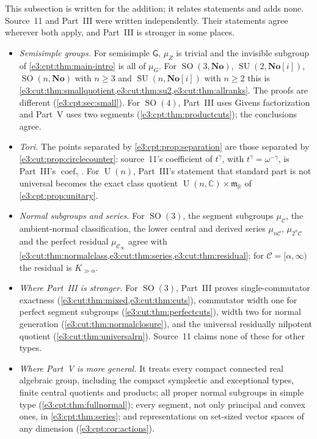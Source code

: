\documentclass[11pt,letterpaper]{article}
\numberwithin{equation}{section}
\theoremstyle{definition}
\theoremstyle{remark}
\newcommand{\No}{\mathbf{No}}
\newcommand{\R}{\mathbb R}
\newcommand{\C}{\mathbb C}
\newcommand{\mm}{\mathfrak m}
\newcommand{\SO}{\operatorname{SO}}
\newcommand{\SU}{\operatorname{SU}}
\newcommand{\Un}{\operatorname{U}}
\newcommand{\coef}{\operatorname{coef}}
\newcommand{\sG}{\mathsf G}
\begin{document}
This subsection is written for the addition; it relates statements and adds
none. Source~11 and Part~III were written independently. Their statements agree
wherever both apply, and Part~III is stronger in some places.
\begin{itemize}
\item \emph{Semisimple groups.} For semisimple $\sG$, $\mu_Z$ is trivial and the
invisible subgroup of \cref{e3:cpt:thm:main-intro} is all of $\mu_G$. For
$\SO(3,\No)$, $\SU(2,\No[i])$, $\SO(n,\No)$ with $n\ge3$ and $\SU(n,\No[i])$
with $n\ge2$ this is
\cref{e3:cut:thm:smallquotient,e3:cut:thm:su2,e3:cut:thm:allranks}. The proofs
are different (\cref{e3:cpt:sec:small}). For $\SO(4)$, Part~III uses Givens
factorization and Part~V uses two segments (\cref{e3:cpt:thm:productcuts}); the
conclusions agree.
\item \emph{Tori.} The points separated by \cref{e3:cpt:prop:separation} are
those separated by \cref{e3:cut:prop:circlecounter}: source~11's coefficient of
$t^\gamma$, with $t^\gamma=\omega^{-\gamma}$, is Part~III's $\coef_\gamma$. For
$\Un(n)$, Part~III's statement that standard part is not universal becomes the
exact class quotient $\Un(n,\C)\times\mm_{\R}$ of \cref{e3:cpt:prop:unitary}.
\item \emph{Normal subgroups and series.} For $\SO(3)$, the segment subgroups
$\mu_{\mathcal C}$, the ambient-normal classification, the lower central and
derived series $\mu_{n\mathcal C}$, $\mu_{2^n\mathcal C}$ and the perfect
residual $\mu_{\mathcal C_\infty}$ agree with
\cref{e3:cut:thm:normalclass,e3:cut:thm:series,e3:cut:thm:residual}; for
$\mathcal C=[\alpha,\infty)$ the residual is $K_{\gg\alpha}$.
\item \emph{Where Part~III is stronger.} For $\SO(3)$, Part~III proves
single-commutator exactness (\cref{e3:cut:thm:mixed,e3:cut:thm:cuts}),
commutator width one for perfect segment subgroups
(\cref{e3:cut:thm:perfectcuts}), width two for normal generation
(\cref{e3:cut:thm:normalclosure}), and the universal residually nilpotent
quotient (\cref{e3:cut:thm:universalrn}). Source~11 claims none of these for
other types.
\item \emph{Where Part~V is more general.} It treats every compact connected real
algebraic group, including the compact symplectic and exceptional types, finite
central quotients and products; all proper normal subgroups in simple type
(\cref{e3:cpt:thm:fullnormal}); every segment, not only principal and convex
ones, in \cref{e3:cpt:thm:series}; and representations on set-sized vector spaces
of any dimension (\cref{e3:cpt:cor:actions}).
\end{itemize}
\end{document}
